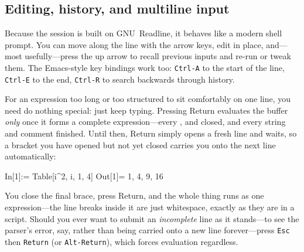 \begin{codepairs}
\end{codepairs}

\subsection{Editing, history, and multiline input}
\label{sec:editing}

Because the session is built on GNU~Readline, it behaves like a modern shell prompt.
You can move along the line with the arrow keys, edit in place, and---most
usefully---press the up arrow to recall previous inputs and re-run or tweak them. The
Emacs-style key bindings work too: \texttt{Ctrl-A} to the start of the line,
\texttt{Ctrl-E} to the end, \texttt{Ctrl-R} to search backwards through history.

For an expression too long or too structured to sit comfortably on one line, you need
do nothing special: just keep typing. Pressing Return
evaluates the buffer \emph{only} once it forms a complete
expression---every \mcode{(}, \mcode{[} and \mcode{\{} closed, and every string and
comment finished. Until then, Return simply opens a fresh line and waits, so a
bracket you have opened but not yet closed carries you onto the next line
automatically:

\begin{shell}
In[1]:= Table[i^2,
{i, 1, 4}]
Out[1]= {1, 4, 9, 16}
\end{shell}

\noindent
You close the final brace, press Return, and the whole thing runs as one
expression---the line breaks inside it are just whitespace, exactly as they are in a
script. Should you ever want to submit an \emph{incomplete} line as it stands---to
see the parser's error, say, rather than being carried onto a new line
forever---press \texttt{Esc} then \texttt{Return} (or \texttt{Alt-Return}), which
forces evaluation regardless.%

